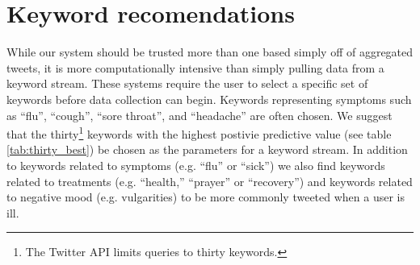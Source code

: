 \documentclass{acm_proc_article-sp}
\begin{document}
\section{Keyword recomendations}


While our system should be trusted more than one based simply off of aggregated tweets, it is more computationally intensive than simply pulling data from a keyword stream. These systems require the user to select a specific set of keywords before data collection can begin. Keywords representing symptoms such as ``flu'', ``cough'', ``sore throat'', and ``headache'' are often chosen. We suggest that the thirty\footnote{The Twitter API limits queries to thirty keywords.} keywords with the highest postivie predictive value (see table \ref{tab:thirty_best}) be chosen as the parameters for a keyword stream. In addition to keywords related to symptoms (e.g. ``flu'' or ``sick'') we also find keywords related to treatments (e.g. ``health,'' ``prayer'' or ``recovery'') and keywords related to negative mood (e.g. vulgarities) to be more commonly tweeted when a user is ill. 


\balancecolumns

\end{document}
